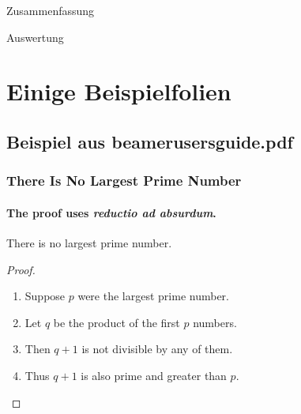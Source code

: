 \documentclass[10pt]{beamer} %
\begin{document}
\begin{frame}{Zusammenfassung}
  
\end{frame}

\begin{frame}{Auswertung}
  
\end{frame}


\section{Einige Beispielfolien}


\subsection{Beispiel aus beamerusersguide.pdf}
\begin{frame}
  \frametitle{There Is No Largest Prime Number}
  \framesubtitle{The proof uses \textit{reductio ad absurdum}.}
  \begin{theorem}
    There is no largest prime number.
  \end{theorem}
  \begin{proof}
    \begin{enumerate}
    \item<1-| alert@1> Suppose $p$ were the largest prime number.
    \item<2-> Let $q$ be the product of the first $p$ numbers.
    \item<3-> Then $q+1$ is not divisible by any of them.
    \item<1-> Thus $q+1$ is also prime and greater than $p$.\qedhere
    \end{enumerate}
  \end{proof}
\end{frame}
\end{document}
